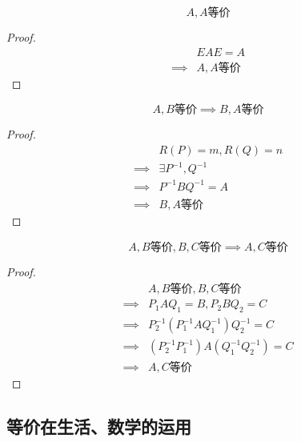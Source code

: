 \documentclass{article}
\begin{document}
\begin{theorem}[反身性]
    \[A,A\text{等价}\]
\end{theorem}

\begin{proof}
    \[\begin{aligned}
                     & EAE=A          \\
            \implies & A,A\text{等价}
        \end{aligned}\]\end{proof}

\begin{theorem}[对称性]
    \[A,B\text{等价}\implies B,A\text{等价}\]
\end{theorem}

\begin{proof}
    \[\begin{aligned}
                     & R\left(P\right)=m,R\left(Q\right)=n \\
            \implies & \exists P^{-1},Q^{-1}               \\
            \implies & P^{-1}BQ^{-1}=A                     \\
            \implies & B,A\text{等价}
        \end{aligned}\]\end{proof}

\begin{theorem}[传递性]
    \[A,B\text{等价},B,C\text{等价}
        \implies A,C\text{等价}\]
\end{theorem}

\begin{proof}
    \[\begin{aligned}
                     & A,B\text{等价},B,C\text{等价}                                 \\
            \implies & P_1AQ_1=B,P_2BQ_2=C                                           \\
            \implies & P_2^{-1}\left(P_1^{-1}AQ_1^{-1}\right)Q_2^{-1}=C              \\
            \implies & \left(P_2^{-1}P_1^{-1}\right)A\left(Q_1^{-1}Q_2^{-1}\right)=C \\
            \implies & A,C\text{等价}
        \end{aligned}\]\end{proof}

\subsection{等价在生活、数学的运用}
\end{document}
